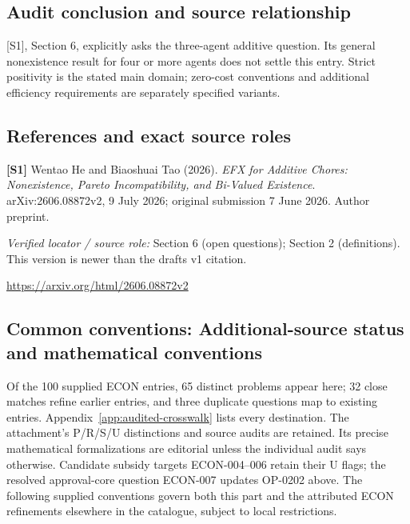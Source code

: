 \documentclass[11pt,a4paper]{article}
\begin{document}
\subsection*{Audit conclusion and source relationship}

[S1], Section 6, explicitly asks the three-agent additive question. Its general nonexistence result for four or more agents does not settle this entry. Strict positivity is the stated main domain; zero-cost conventions and additional efficiency requirements are separately specified variants.

\subsection*{References and exact source roles}

{\footnotesize\raggedright
\par\noindent\textbf{[S1]} Wentao He and Biaoshuai Tao (2026). \emph{EFX for Additive Chores: Nonexistence, Pareto Incompatibility, and Bi-Valued Existence}. arXiv:2606.08872v2, 9 July 2026; original submission 7 June 2026. Author preprint.\par \textit{Verified locator / source role:} Section 6 (open questions); Section 2 (definitions). This version is newer than the draft\textquotesingle s v1 citation.\par \url{https://arxiv.org/html/2606.08872v2}\par\smallskip
}

\subsection*{Common conventions: Additional-source status and mathematical conventions}

\label{audited:conventions}

Of the 100 supplied ECON entries, 65 distinct problems appear here; 32 close
matches refine earlier entries, and three duplicate questions map to existing
entries. Appendix~\ref{app:audited-crosswalk} lists every destination.
The attachment's P/R/S/U distinctions and source audits are retained. Its
precise mathematical formalizations are editorial unless the individual audit
says otherwise. Candidate subsidy targets ECON-004--006 retain their U flags;
the resolved approval-core question ECON-007 updates OP-0202 above.
The following supplied conventions govern both this part and the attributed
ECON refinements elsewhere in the catalogue, subject to local restrictions.
\end{document}
